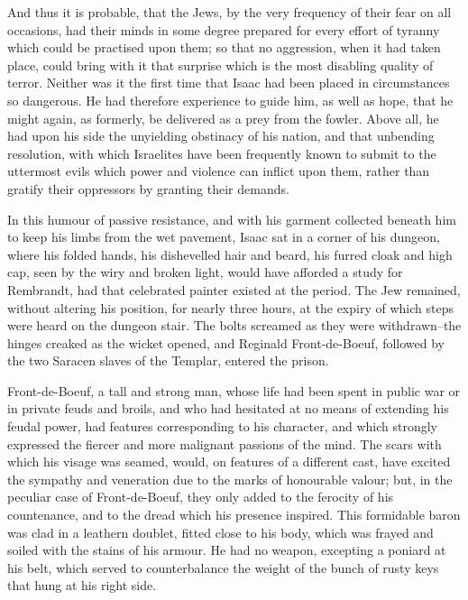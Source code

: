 And thus it is probable, that the Jews, by the very frequency of their
fear on all occasions, had their minds in some degree prepared for every
effort of tyranny which could be practised upon them; so that no
aggression, when it had taken place, could bring with it that surprise
which is the most disabling quality of terror. Neither was it the first
time that Isaac had been placed in circumstances so dangerous. He had
therefore experience to guide him, as well as hope, that he might again,
as formerly, be delivered as a prey from the fowler. Above all, he had
upon his side the unyielding obstinacy of his nation, and that unbending
resolution, with which Israelites have been frequently known to submit
to the uttermost evils which power and violence can inflict upon them,
rather than gratify their oppressors by granting their demands.

In this humour of passive resistance, and with his garment collected
beneath him to keep his limbs from the wet pavement, Isaac sat in a
corner of his dungeon, where his folded hands, his dishevelled hair and
beard, his furred cloak and high cap, seen by the wiry and broken light,
would have afforded a study for Rembrandt, had that celebrated painter
existed at the period. The Jew remained, without altering his position,
for nearly three hours, at the expiry of which steps were heard on the
dungeon stair. The bolts screamed as they were withdrawn--the hinges
creaked as the wicket opened, and Reginald Front-de-Boeuf, followed by
the two Saracen slaves of the Templar, entered the prison.

Front-de-Boeuf, a tall and strong man, whose life had been spent in
public war or in private feuds and broils, and who had hesitated at no
means of extending his feudal power, had features corresponding to his
character, and which strongly expressed the fiercer and more malignant
passions of the mind. The scars with which his visage was seamed, would,
on features of a different cast, have excited the sympathy and
veneration due to the marks of honourable valour; but, in the peculiar
case of Front-de-Boeuf, they only added to the ferocity of his
countenance, and to the dread which his presence inspired. This
formidable baron was clad in a leathern doublet, fitted close to his
body, which was frayed and soiled with the stains of his armour. He had
no weapon, excepting a poniard at his belt, which served to
counterbalance the weight of the bunch of rusty keys that hung at his
right side.

